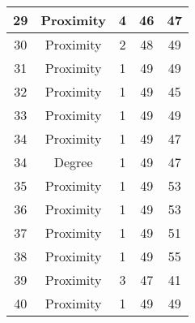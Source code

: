 \documentclass[results.tex]{subfiles}
\begin{document}
\begin{center}
\begin{tabular}{| c || c | c | c | c |}
            \hline
            29                      & Proximity                    & 4                      & 46                      & 47                   \\
            \hline
            30                      & Proximity                    & 2                      & 48                      & 49                   \\
            \hline
            31                      & Proximity                    & 1                      & 49                      & 49                   \\
            \hline
            32                      & Proximity                    & 1                      & 49                      & 45                   \\
            \hline
            33                      & Proximity                    & 1                      & 49                      & 49                   \\
            \hline
            34                      & Proximity                    & 1                      & 49                      & 47                   \\
            \hline
            34                      & Degree                       & 1                      & 49                      & 47                   \\
            \hline
            35                      & Proximity                    & 1                      & 49                      & 53                   \\
            \hline
            36                      & Proximity                    & 1                      & 49                      & 53                   \\
            \hline
            37                      & Proximity                    & 1                      & 49                      & 51                   \\
            \hline
            38                      & Proximity                    & 1                      & 49                      & 55                   \\
            \hline
            39                      & Proximity                    & 3                      & 47                      & 41                   \\
            \hline
            40                      & Proximity                    & 1                      & 49                      & 49                   \\

\end{tabular}
\end{center}
\end{document}
